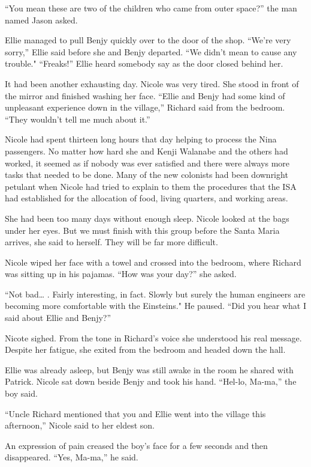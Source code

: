 \documentclass[]{article}
\begin{document}
{“You mean these are two of the children who came from outer space?” the man named Jason asked.

Ellie managed to pull Benjy quickly over to the door of the shop.  “We’re very sorry,” Ellie said before she and Benjy departed.  “We didn’t mean to cause any trouble."  “Freaks!” Ellie heard somebody say as the door closed behind her.

It had been another exhausting day.  Nicole was very tired.  She stood in front of the mirror and finished washing her face.  “Ellie and Benjy had some kind of unpleasant experience down in the village,” Richard said from the bedroom.  “They wouldn’t tell me much about it.”

Nicole had spent thirteen long hours that day helping to process the Nina passengers.  No matter how hard she and Kenji Walanabe and the others had worked, it seemed as if nobody was ever satisfied and there were always more tasks that needed to be done.  Many of the new colonists had been downright petulant when Nicole had tried to explain to them the procedures that the ISA had established for the allocation of food, living quarters, and working areas.

She had been too many days without enough sleep.  Nicole looked at the bags under her eyes.  But we must finish with this group before the Santa Maria arrives, she said to herself.  They will be far more difficult.

Nicole wiped her face with a towel and crossed into the bedroom, where Richard was sitting up in his pajamas.  “How was your day?” she asked.

“Not bad… .  Fairly interesting, in fact.  Slowly but surely the human engineers are becoming more comfortable with the Einsteins."  He paused.  “Did you hear what I said about Ellie and Benjy?”

Nicote sighed.  From the tone in Richard’s voice she understood his real message.  Despite her fatigue, she exited from the bedroom and headed down the hall.

Ellie was already asleep, but Benjy was still awake in the room he shared with Patrick.  Nicole sat down beside Benjy and took his hand.  “Hel-lo, Ma-ma,” the boy said.

“Uncle Richard mentioned that you and Ellie went into the village this afternoon,” Nicole said to her eldest son.

An expression of pain creased the boy’s face for a few seconds and then disappeared.  “Yes, Ma-ma,” he said.

}
\end{document}
